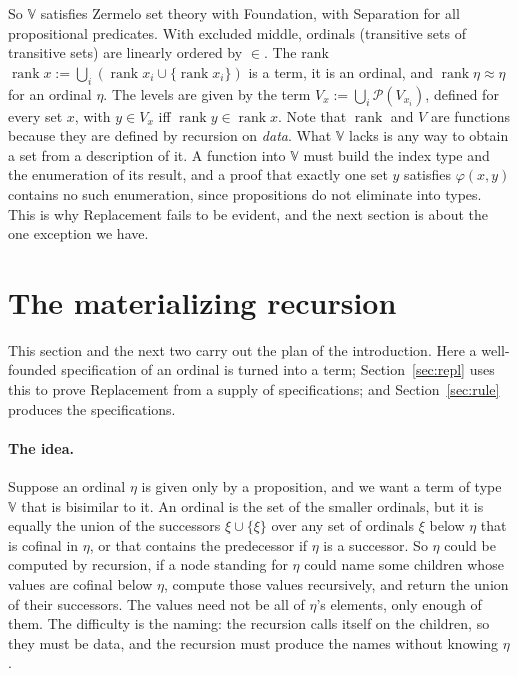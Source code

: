 \documentclass[10pt]{article}
\theoremstyle{definition}
\theoremstyle{remark}
\newcommand{\rk}{\operatorname{rank}}
\newcommand{\V}{\mathbb{V}}
\begin{document}
So $\V$ satisfies Zermelo set theory with Foundation, with Separation
for all propositional predicates. With excluded middle, ordinals
(transitive sets of transitive sets) are linearly ordered by $\in$. The
rank $\rk x:=\bigcup_i(\rk x_i\cup\{\rk x_i\})$ is a term, it is an
ordinal, and $\rk\eta\approx\eta$ for an ordinal $\eta$. The levels are given by
the term $V_x:=\bigcup_i\mathcal P(V_{x_i})$, defined for every set
$x$, with $y\in V_x$ iff $\rk y\in\rk x$. Note that $\rk$ and $V$ are
functions because they are defined by recursion on \emph{data}. What
$\V$ lacks is any way to obtain a set from a description of it. A
function into $\V$ must build the index type and the enumeration of its
result, and a proof that exactly one set $y$ satisfies $\varphi(x,y)$ contains
no such enumeration, since propositions do not eliminate into types.
This is why Replacement fails to be evident, and the next section is
about the one exception we have.

\section{The materializing recursion}\label{sec:mat}

This section and the next two carry out the plan of the introduction.
Here a well-founded specification of an ordinal is turned into a term;
Section~\ref{sec:repl} uses this to prove Replacement from a supply of
specifications; and Section~\ref{sec:rule} produces the specifications.

\paragraph{The idea.}
Suppose an ordinal $\eta$ is given only by a proposition, and we want a
term of type $\V$ that is bisimilar to it. An ordinal is the set of the
smaller ordinals, but it is equally the union of the successors
$\xi\cup\{\xi\}$ over any set of ordinals $\xi$ below $\eta$ that is cofinal in
$\eta$, or that contains the predecessor if $\eta$ is a successor. So $\eta$
could be computed by recursion, if a node standing for $\eta$ could name
some children whose values are cofinal below $\eta$, compute those values
recursively, and return the union of their successors. The values need
not be all of $\eta$'s elements, only enough of them. The difficulty is
the naming: the recursion calls itself on the children, so they must be
data, and the recursion must produce the names without knowing $\eta$.
\end{document}

